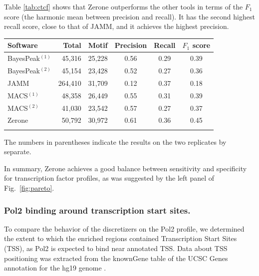\documentclass{bioinfo}
\begin{document}
Table \ref{tab:ctcf} shows that Zerone outperforms the other tools
in terms of the $F_1$ score (the harmonic mean between precision and
recall). It has the second highest recall score, close to that of JAMM,
and it achieves the highest precision.

\begin{table}[!t]
{\begin{tabular}{lrrccc}
        \toprule
        \textbf{Software}  & \textbf{Total}  & \textbf{Motif} &
        \textbf{Precision} & \textbf{Recall} & \textbf{$F_{1}$ score} \\
        \midrule
        BayesPeak$^{(1)}$ &  45,316 & 25,228 & 0.56 & 0.29 & 0.39 \\
        BayesPeak$^{(2)}$ &  45,154 & 23,428 & 0.52 & 0.27 & 0.36 \\
        JAMM              & 264,410 & 31,709 & 0.12 & 0.37 & 0.18 \\
        MACS$^{(1)}$      &  48,358 & 26,449 & 0.55 & 0.31 & 0.39 \\
        MACS$^{(2)}$      &  41,030 & 23,542 & 0.57 & 0.27 & 0.37 \\
        Zerone            &  50,792 & 30,972 & 0.61 & 0.36 & 0.45 \\
        \botrule
\end{tabular}}{The numbers in parentheses indicate the results on the two
replicates by separate.}
\end{table}

In summary, Zerone achieves a good balance between sensitivity and
specificity for transcription factor profiles, as was suggested by
the left panel of Fig.~\ref{fig:pareto}.

\subsubsection{Pol2 binding around transcription start sites.}
To compare the behavior of the discretizers on the Pol2 profile,
we determined the extent to which the enriched regions contained
Transcription Start Sites (TSS), as Pol2 is expected to bind near
annotated TSS. Data about TSS positioning was extracted from the
knownGene table of the UCSC Genes annotation for the hg19 genome
\citep{Karolchik2004}.
\end{document}
